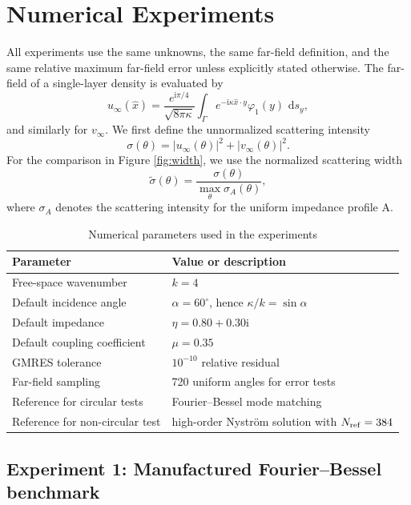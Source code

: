\documentclass[11pt]{article}
\numberwithin{equation}{section}
\newcommand{\ii}{\mathrm{i}}
\newcommand{\dd}{\,\mathrm{d}}
\begin{document}
\section{Numerical Experiments}

All experiments use the same unknowns, the same far-field definition, and the same relative maximum far-field error unless explicitly stated otherwise. The far-field of a single-layer density is evaluated by
\begin{equation}
u_\infty(\hat x)=
\frac{e^{\ii\pi/4}}{\sqrt{8\pi\kappa}}
\int_\Gamma e^{-\ii\kappa \hat x\cdot y}\varphi_1(y)\,\dd s_y,
\end{equation}
and similarly for $v_\infty$. We first define the unnormalized scattering intensity
\begin{equation}
\sigma(\theta)=|u_\infty(\theta)|^2+|v_\infty(\theta)|^2.
\label{eq:sigma}
\end{equation}
For the comparison in Figure \ref{fig:width}, we use the normalized scattering width
\begin{equation}
\widetilde{\sigma}(\theta)
=\frac{\sigma(\theta)}{\max_\theta\sigma_A(\theta)},
\label{eq:sigma_norm}
\end{equation}
where $\sigma_A$ denotes the scattering intensity for the uniform impedance profile A.

\begin{table}[htbp]
\centering
\caption{Numerical parameters used in the experiments}
\begin{tabular}{ll}
\toprule
Parameter & Value or description\\
\midrule
Free-space wavenumber & $k=4$\\
Default incidence angle & $\alpha=60^\circ$, hence $\kappa/k=\sin\alpha$\\
Default impedance & $\eta=0.80+0.30\ii$\\
Default coupling coefficient & $\mu=0.35$\\
GMRES tolerance & $10^{-10}$ relative residual\\
Far-field sampling & 720 uniform angles for error tests\\
Reference for circular tests & Fourier--Bessel mode matching\\
Reference for non-circular test & high-order Nystr\"om solution with $N_{\rm ref}=384$\\
\bottomrule
\end{tabular}
\end{table}

\subsection{Experiment 1: Manufactured Fourier--Bessel benchmark}
\end{document}
